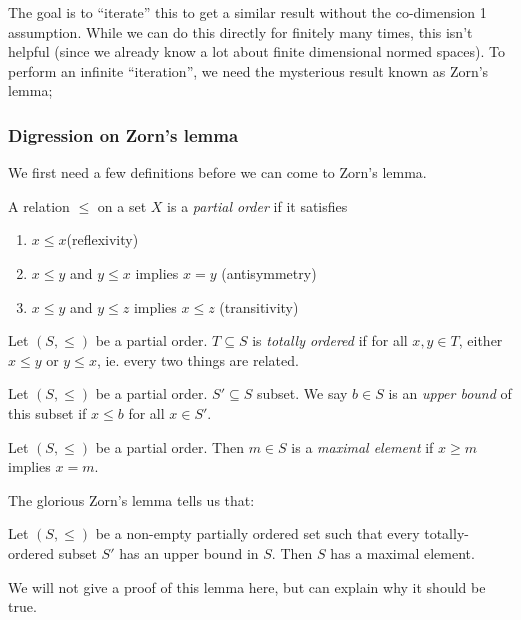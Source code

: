 \documentclass[a4paper]{article}
\begin{document}
The goal is to ``iterate'' this to get a similar result without the co-dimension 1 assumption. While we can do this directly for finitely many times, this isn't helpful (since we already know a lot about finite dimensional normed spaces). To perform an infinite ``iteration'', we need the mysterious result known as Zorn's lemma;
\subsubsection*{Digression on Zorn's lemma}
We first need a few definitions before we can come to Zorn's lemma.
\begin{defi}
  A relation $\leq$ on a set $X$ is a \emph{partial order} if it satisfies
  \begin{enumerate}
    \item $x \leq x$\hfill (reflexivity)
    \item $x \leq y$ and $y \leq x$ implies $x = y$ \hfill (antisymmetry)
    \item $x \leq y$ and $y \leq z$ implies $x \leq z$ \hfill (transitivity)
  \end{enumerate}
\end{defi}

\begin{defi}
  Let $(S, \leq)$ be a partial order. $T\subseteq S$ is \emph{totally ordered} if for all $x, y\in T$, either $x \leq y$ or $y\leq x$, ie. every two things are related.
\end{defi}

\begin{defi}
  Let $(S, \leq)$ be a partial order. $S'\subseteq S$ subset. We say $b\in S$ is an \emph{upper bound} of this subset if $x \leq b$ for all $x \in S'$.
\end{defi}

\begin{defi}
  Let $(S, \leq)$ be a partial order. Then $m\in S$ is a \emph{maximal element} if $x \geq m$ implies $x = m$.
\end{defi}

The glorious Zorn's lemma tells us that:
\begin{lemma}
  Let $(S, \leq)$ be a non-empty partially ordered set such that every totally-ordered subset $S'$ has an upper bound in $S$. Then $S$ has a maximal element.
\end{lemma}
We will not give a proof of this lemma here, but can explain why it should be true.
\end{document}
